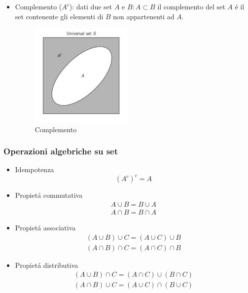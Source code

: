 \begin{itemize}
{                }
                \item {Complemento ($A^c$): dati due set $A$ e $B:A\subset B$ il complemento del set $A$ é il set contenente gli elementi di $B$ non appartenenti ad $A$.
                \begin{figure}[H]
                    \centering
                    \includegraphics[width = 5cm]{media/Insieme_Complementare.png}
                    \caption{Complemento}
                \end{figure}
                }
            \end{itemize}
        \subsubsection{Operazioni algebriche su set}
            \begin{itemize}
                \item {Idempotenza
                    \[
                        \left(A^c\right)^c = A
                    \]
                }
                \item {Propietá commutativa
                    \begin{gather}
                        A\cup B = B\cup A \nonumber \\
                        A\cap B = B\cap A \nonumber
                    \end{gather}
                }
                \item {Propietá associativa
                    \begin{gather}
                        (A\cup B) \cup C= (A\cup C)\cup B \nonumber \\
                        (A\cap B) \cap C= (A\cap C)\cap B \nonumber                        
                    \end{gather}
                }
                \item {Propietá distributiva
                    \begin{gather}
                        (A\cup B) \cap C= (A\cap C)\cup (B \cap C) \nonumber \\
                        (A\cap B) \cup C= (A\cup C)\cap (B \cup C) \nonumber                        
                    \end{gather}
                }
            \end{itemize}

